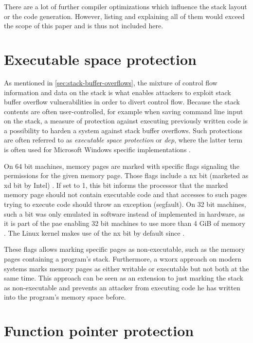 There are a lot of further compiler optimizations which influence the stack layout or the code generation.
However, listing and explaining all of them would exceed the scope of this paper and is thus not included here.

\section{Executable space protection}
\label{sec:executable-space-protection}

As mentioned in \cref{sec:stack-buffer-overflows}, the mixture of control flow information and data on the stack is what enables attackers to exploit stack buffer overflow vulnerabilities in order to divert control flow.
Because the stack contents are often user-controlled, for example when saving command line input on the stack, a measure of protection against executing previously written code is a possibility to harden a system against stack buffer overflows.
Such protections are often referred to as \emph{executable space protection} or \emph{\gls{dep}}, where the latter term is often used for Microsoft Windows specific implementations \cite{Satran2018}.

On 64 bit machines, memory pages are marked with specific flags signaling the permissions for the given memory page.
Those flags include a \gls{nx} bit (marketed as \gls{xd} bit by Intel) \cite[801\psq]{Bryant2011}.
If set to 1, this bit informs the processor that the marked memory page should not contain executable code and that accesses to such pages trying to execute code should throw an exception (\acl{segfault}).
On 32 bit machines, such a bit was only emulated in software instead of implemented in hardware, as it is part of the \gls{pae} enabling 32 bit machines to use more than 4 GiB of memory \cite{Molnar2004}.
The Linux kernel makes use of the \gls{nx} bit by default since \citeyear{Cook2010} \cite{Cook2010}.

These flags allows marking specific pages as non-executable, such as the memory pages containing a program's stack.
Furthermore, a \gls{wxorx} approach on modern systems marks memory pages as either writable or executable but not both at the same time.
This approach can be seen as an extension to just marking the stack as non-executable and prevents an attacker from executing code he has written into the program's memory space before.

\section{Function pointer protection}
\label{sec:function-pointer-protection}

